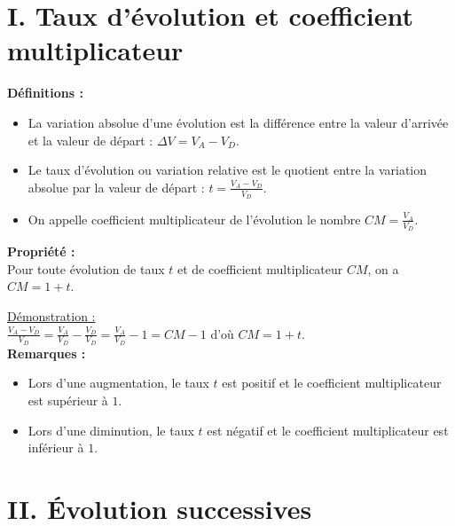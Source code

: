 \documentclass[11pt,a4paper]{article}
\title{\doctitre}
\author{\docniveau \\ \doctheme\text{ - }\doctype}
\date{}
\begin{document}
\maketitle
\pagestyle{custom}
\thispagestyle{custom}

\section*{I. Taux d'évolution et coefficient multiplicateur}

\begin{mdframed}[style=definitionStyle]
    \textbf{Définitions :}
    \vspace{-4pt}
    \begin{itemize}
        \item La variation absolue d'une évolution est la différence entre la valeur d'arrivée et la valeur de départ : $\Delta V=V_A-V_D$.
        \item Le taux d'évolution ou variation relative est le quotient entre la variation absolue par la valeur de départ : $t=\frac{V_A-V_D}{V_D}$.
        \item On appelle coefficient multiplicateur de l'évolution le nombre $CM=\frac{V_A}{V_D}$.
    \end{itemize}
\end{mdframed}

\begin{mdframed}[style=proprieteStyle]
    \textbf{Propriété :} ~\\
    Pour toute évolution de taux $t$ et de coefficient multiplicateur $CM$, on a $CM=1+t$.
\end{mdframed}

\underline{Démonstration :} ~\\

$\displaystyle\frac{V_A-V_D}{V_D}=\frac{V_A}{V_D}-\frac{V_D}{V_D}=\frac{V_A}{V_D}-1=CM-1$ d'où $CM=1+t$. \\

\textbf{Remarques :} 
\vspace*{-4pt}
\begin{itemize}
    \item Lors d'une augmentation, le taux $t$ est positif et le coefficient multiplicateur est supérieur à $1$.
    \item Lors d'une diminution, le taux $t$ est négatif et le coefficient multiplicateur est inférieur à $1$.
\end{itemize}

\section*{II. Évolution successives}
\end{document}
